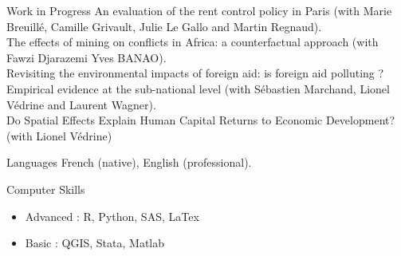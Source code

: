 \documentclass{resume} %
\begin{document}
\begin{rSection}{Work in Progress}
\vspace*{4mm}
An evaluation of the rent control policy in Paris (with Marie Breuillé,
Camille Grivault, Julie Le Gallo and Martin Regnaud).\\

The effects of mining on conflicts in Africa: a counterfactual approach (with Fawzi Djarazemi Yves BANAO).\\

Revisiting the environmental impacts of foreign aid: is foreign aid polluting ? Empirical evidence at the sub-national level (with Sébastien Marchand, Lionel Védrine and Laurent Wagner).\\

Do Spatial Effects Explain Human Capital Returns to Economic Development? (with Lionel Védrine) \\
  
\end{rSection}

\newpage
\begin{rSection}{Languages}
French (native), English (professional).
\vspace*{5mm}
\end{rSection}

\begin{rSection}{Computer Skills}
\begin{itemize}
	\item Advanced : R, Python, SAS, LaTex 
	\item Basic : QGIS, Stata, Matlab 
\end{itemize}
\end{rSection}
\end{document}
